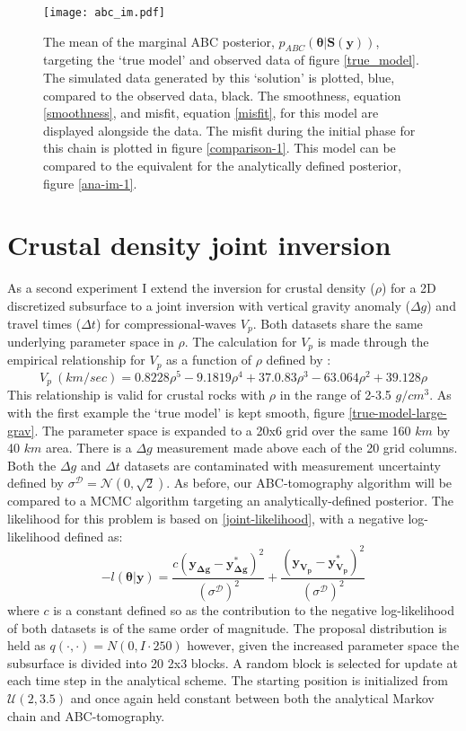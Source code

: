 \begin{figure}[H]
	\centering
	\texttt{[image: abc\_im.pdf]}
	\caption{The mean of the marginal ABC posterior, $p_{ABC}(\bm{\theta}|\bm{S}(\bm{y}))$, targeting the `true model' and observed data of figure \ref{true_model}. The simulated data generated by this `solution' is plotted, blue, compared to the observed data, black. The smoothness, equation \ref{smoothness}, and misfit, equation \ref{misfit}, for this model are displayed alongside the data. The misfit during the initial phase for this chain is plotted in figure \ref{comparison-1}. This model can be compared to the equivalent for the analytically defined posterior, figure \ref{ana-im-1}.}
	\label{abc-im-1}
\end{figure}


\section{Crustal density joint inversion}

As a second experiment I extend the inversion for crustal density ($\rho$) for a 2D discretized subsurface to a joint inversion with vertical gravity anomaly ($\Delta g$) and travel times ($\Delta t$) for compressional-waves $V_p$. Both datasets share the same underlying parameter space in $\rho$. The calculation for $V_p$ is made through the empirical relationship for $V_p$ as a function of $\rho$ defined by \citet{Brocher2005}:
\begin{equation}
	V_p\ (km/sec) = 0.8228\rho^5 - 9.1819\rho^4 + 37.0.83\rho^3 - 63.064\rho^2 + 39.128\rho
	\label{rhotovp}
\end{equation}
This relationship is valid for crustal rocks with $\rho$ in the range of 2-3.5 $g/cm^3$. As with the first example the `true model' is kept smooth, figure \ref{true-model-large-grav}. The parameter space is expanded to a 20x6 grid over the same 160 $km$ by 40 $km$ area. There is a $\Delta g$ measurement made above each of the 20 grid columns. Both the $\Delta g$ and $\Delta t$ datasets are contaminated with measurement uncertainty defined by $\sigma^{\mathcal{D}} = \mathcal{N}(0,\sqrt{2})$. As before, our ABC-tomography algorithm will be compared to a MCMC algorithm targeting an analytically-defined posterior. The likelihood for this problem is based on \ref{joint-likelihood}, with a negative log-likelihood defined as:
\begin{equation}
	-l(\bm{\theta}|\bm{y}) = \frac{c(\bm{y_{\Delta g}}-\bm{y^*_{\Delta g}})^2}{(\sigma^{\mathcal{D}})^2} + \frac{(\bm{y_{V_p}}-\bm{y^*_{V_p}})^2}{(\sigma^{\mathcal{D}})^2}
\end{equation}
where $c$ is a constant defined so as the contribution to the negative log-likelihood of both datasets is of the same order of magnitude. The proposal distribution is held as $q(\cdot,\cdot) = N(0,I\cdot250)$ however, given the increased parameter space the subsurface is divided into 20 2x3 blocks. A random block is selected for update at each time step in the analytical scheme. The starting position is initialized from $\mathcal{U}(2,3.5)$  and once again held constant between both the analytical Markov chain and ABC-tomography. \par

